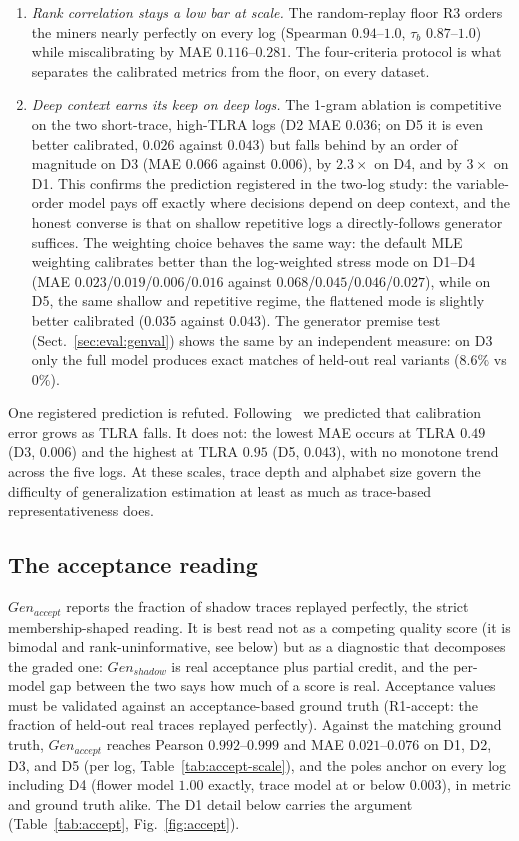 \documentclass[runningheads]{llncs}
\newcommand{\chg}[1]{\textcolor{chgblue}{#1}}
\newcommand{\genshadow}{\ensuremath{\mathit{Gen}_{\mathit{shadow}}}}
\newcommand{\genaccept}{\ensuremath{\mathit{Gen}_{\mathit{accept}}}}
\begin{document}
{\begin{enumerate}
  \item \emph{Rank correlation stays a low bar at scale.} The random-replay floor R3 orders the miners nearly perfectly on every log (Spearman $0.94$--$1.0$, $\tau_b$ $0.87$--$1.0$) while miscalibrating by MAE $0.116$--$0.281$. The four-criteria protocol is what separates the calibrated metrics from the floor, on every dataset.
  \item \emph{Deep context earns its keep on deep logs.} The 1-gram ablation is competitive on the two short-trace, high-TLRA logs (D2 MAE $0.036$; on D5 it is even better calibrated, $0.026$ against $0.043$) but falls behind by an order of magnitude on D3 (MAE $0.066$ against $0.006$), by $2.3\times$ on D4, and by $3\times$ on D1. This confirms the prediction registered in the two-log study: the variable-order model pays off exactly where decisions depend on deep context, and the honest converse is that on shallow repetitive logs a directly-follows generator suffices. The weighting choice behaves the same way: the default MLE weighting calibrates better than the log-weighted stress mode on D1--D4 (MAE $0.023$/$0.019$/$0.006$/$0.016$ against $0.068$/$0.045$/$0.046$/$0.027$), while on D5, the same shallow and repetitive regime, the flattened mode is slightly better calibrated ($0.035$ against $0.043$). The generator premise test (Sect.~\ref{sec:eval:genval}) shows the same by an independent measure: on D3 only the full model produces exact matches of held-out real variants ($8.6\%$ vs $0\%$).
\end{enumerate}

One registered prediction is refuted. Following~\cite{karunaratne2024representativeness} we predicted that calibration error grows as TLRA falls. It does not: the lowest MAE occurs at TLRA $0.49$ (D3, $0.006$) and the highest at TLRA $0.95$ (D5, $0.043$), with no monotone trend across the five logs. At these scales, trace depth and alphabet size govern the difficulty of generalization estimation at least as much as trace-based representativeness does.
}

\subsection{The acceptance reading}
\label{sec:eval:accept}
\genaccept{} reports the fraction of shadow traces replayed perfectly, the strict membership-shaped reading. It is best read not as a competing quality score (it is bimodal and rank-uninformative, see below) but as a diagnostic that decomposes the graded one: $\genshadow$ is real acceptance plus partial credit, and the per-model gap between the two says how much of a score is real. Acceptance values must be validated against an acceptance-based ground truth (R1-accept: the fraction of held-out real traces replayed perfectly). \chg{Against the matching ground truth, \genaccept{} reaches Pearson $0.992$--$0.999$ and MAE $0.021$--$0.076$ on D1, D2, D3, and D5 (per log, Table~\ref{tab:accept-scale}), and the poles anchor on every log including D4 (flower model $1.00$ exactly, trace model at or below $0.003$), in metric and ground truth alike.} The D1 detail below carries the argument (Table~\ref{tab:accept}, Fig.~\ref{fig:accept}).
\end{document}
